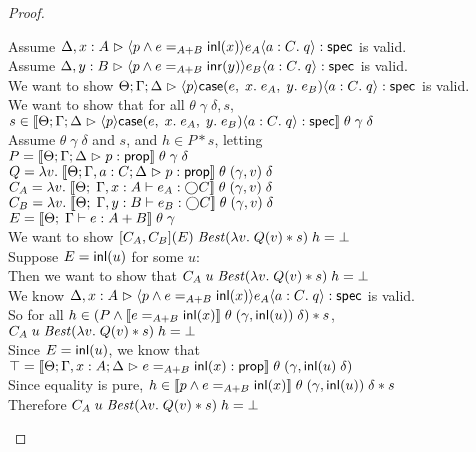\begin{proof}
\begin{tabbedproof}
\oo Assume $\judgeS[\Delta,x:A]{\mspec{p \land e =_{A+B} \inl(x)}{e_A}{a:C}{q}}$ is valid. \\
\oo Assume $\judgeS[\Delta,y:B]{\mspec{p \land e =_{A+B} \inr(y)}{e_B}{a:C}{q}}$ is valid. \\
\ooo We want to show $\judgeS{\mspec{p}{\Case{e}{x}{e_A}{y}{e_B}}{a:C}{q}}$ is valid. \\
\ooo We want to show that for all $\theta\;\gamma\;\delta, s$, \\
\ooox $s \in \interp{\judgeS{\mspec{p}{\Case{e}{x}{e_A}{y}{e_B}}{a:C}{q}}}\;\theta\;\gamma\;\delta$ \\
\ooo Assume $\theta\;\gamma\;\delta$ and $s$, and $h \in P * s$, letting \\
\ooox $P = \interp{\judgeA{p}{\assert}}\;\theta\;\gamma\;\delta$ \\
\ooox $Q = \semfun{v}{\interp{\judgeA[\Theta; \Gamma, a:C; \Delta]{p}{\assert}}\;\theta\;(\gamma, v)\;\delta}$ \\
\ooox $C_A = \semfun{v}{\interp{\judgeE{\Gamma, x:A}{e_A}{\monad{C}}}\;\theta\;(\gamma, v)\;\delta}$ \\
\ooox $C_B = \semfun{v}{\interp{\judgeE{\Gamma, y:B}{e_B}{\monad{C}}}\;\theta\;(\gamma, v)\;\delta}$ \\
\ooox $E = \interp{\judgeE[\Theta]{\Gamma}{e}{A+B}}\;\theta\;\gamma$ \\
\oooo We want to show $[C_A,C_B](E)\;\mathit{Best}(\semfun{v}{Q(v)*s})\;h = \bot$\\
\oooo Suppose $E = \inl(u)$ for some $u$: \\
\ooooo Then we want to show that $C_A\;u\;\mathit{Best}(\semfun{v}{Q(v)*s})\;h = \bot$\\
\ooooo We know $\judgeS[\Delta,x:A]{\mspec{p \land e =_{A+B} \inl(x)}{e_A}{a:C}{q}}$ is valid. \\
\ooooo So for all $h \in (P \land \interp{e =_{A+B} \inl(x)}\;\theta\;(\gamma,\inl(u))\;\delta) * s$, $C_A\;u\;\mathit{Best}(\semfun{v}{Q(v)*s})\;h = \bot$\\
\ooooo Since $E=\inl(u)$, we know that $\top = \interp{\judgeA[\Theta; \Gamma, x:A; \Delta]{e=_{A+B}\inl(x)}{\assert}}\;\theta\;(\gamma,\inl(u)\;\delta)$\\
\ooooo Since equality is pure, $h \in \interp{p \land e =_{A+B} \inl(x)}\;\theta\;(\gamma,\inl(u))\;\delta * s$ \\
\ooooo Therefore $C_A\;u\;\mathit{Best}(\semfun{v}{Q(v)*s})\;h = \bot$\\

\end{tabbedproof}
\end{proof}
